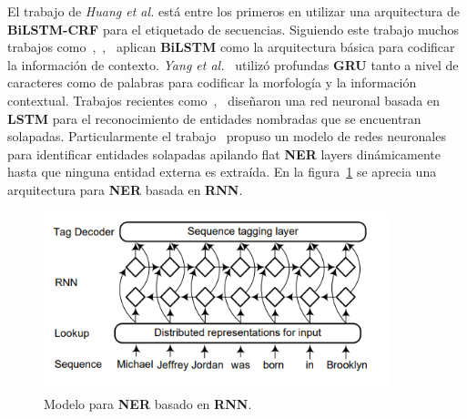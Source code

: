 El trabajo de \emph{Huang et al.}\cite{huang2015bidirectional} est\'a entre los primeros en utilizar una arquitectura de \textbf{BiLSTM-CRF} para el etiquetado de secuencias. Siguiendo este trabajo muchos trabajos como~\cite{chiu2016named},~\cite{ma2016end},~\cite{wei2016disease} aplican \textbf{BiLSTM} como la arquitectura b\'asica para codificar la informaci\'on de contexto. \emph{Yang et al.}~\cite{yang2016multi} utiliz\'o profundas \textbf{GRU} tanto a nivel de caracteres como de palabras para codificar la morfolog\'ia y la informaci\'on contextual. Trabajos recientes como~\cite{katiyar2018nested},~\cite{ju2018neural} dise\~naron una red neuronal basada en \textbf{LSTM} para el reconocimiento de entidades nombradas que se encuentran solapadas. Particularmente el trabajo~\cite{ju2018neural} propuso un modelo de redes neuronales para identificar entidades solapadas apilando flat \textbf{NER} layers din\'amicamente hasta que ninguna entidad externa es extra\'ida. En la figura~\ref{fig:RNN} se aprecia una arquitectura para \textbf{NER} basada en \textbf{RNN}.

\begin{figure}[h!]
	\centering
	\includegraphics[width = 10cm]{Imagenes/RNN_Arquitecture.png}
	\caption{Modelo para \textbf{NER} basado en \textbf{RNN}.}\label{fig:RNN}
\end{figure}

%

